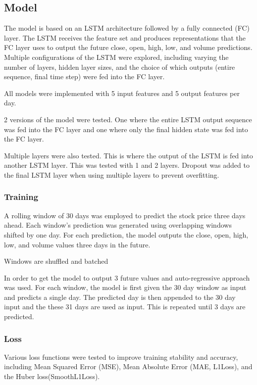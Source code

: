 \subsection{Model}

The model\cite{rnn_pytorch} is based on an LSTM architecture followed by a fully connected (FC) layer. The LSTM receives the feature set and produces representations that the FC layer uses to output the future close, open, high, low, and volume predictions. Multiple configurations of the LSTM were explored, including varying the number of layers, hidden layer sizes, and the choice of which outputs (entire sequence, final time step) were fed into the FC layer.

All models were implemented with 5 input features and 5 output features per day.  

2 versions of the model were tested. One where the entire LSTM output sequence was fed into the FC layer and one where only the final hidden state was fed into the FC layer.

Multiple layers were also tested. This is where the output of the LSTM is fed into another LSTM layer. This was tested with 1 and 2 layers. Dropout was added to the final LSTM layer when using multiple layers to prevent overfitting.

\subsubsection{Training}

A rolling window of 30 days was employed to predict the stock price three days ahead. Each window’s prediction was generated using overlapping windows shifted by one day. For each prediction, the model outputs the close, open, high, low, and volume values three days in the future. 

Windows are shuffled and batched

In order to get the model to output 3 future values and auto-regressive approach was used. 
For each window, the model is first given the 30 day window as input and predicts a single day. The predicted day is then appended to the 30 day input and the these 31 days are used as input. This is repeated until 3 days are predicted. 

\subsubsection{Loss}

Various loss functions were tested to improve training stability and accuracy, including Mean Squared Error (MSE), Mean Absolute Error (MAE, L1Loss), and the Huber loss(SmoothL1Loss).

